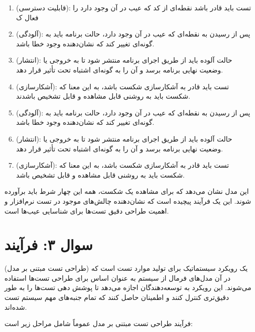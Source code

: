 \begin{enumerate}
	\item {} (قابلیت دسترسی): تست باید قادر باشد نقطه‌ای از کد که عیب در آن وجود دارد را فعال ک
	\item {} (آلودگی): پس از رسیدن به نقطه‌ای که عیب در آن وجود دارد، حالت برنامه باید به گونه‌ای تغییر کند که نشان‌دهنده وجود خطا باشد.
	
	\item {} (انتشار): حالت آلوده باید از طریق اجرای برنامه منتشر شود تا به خروجی یا وضعیت نهایی برنامه برسد و آن را به گونه‌ای اشتباه تحت تأثیر قرار دهد.
	
	\item {} (آشکارسازی): تست باید قادر به آشکارسازی شکست باشد، به این معنا که شکست باید به روشنی قابل مشاهده و قابل تشخیص باشدند.

	\item {} (آلودگی): پس از رسیدن به نقطه‌ای که عیب در آن وجود دارد، حالت برنامه باید به گونه‌ای تغییر کند که نشان‌دهنده وجود خطا باشد.
	
	\item {} (انتشار): حالت آلوده باید از طریق اجرای برنامه منتشر شود تا به خروجی یا وضعیت نهایی برنامه برسد و آن را به گونه‌ای اشتباه تحت تأثیر قرار دهد.
	
	\item {} (آشکارسازی): تست باید قادر به آشکارسازی شکست باشد، به این معنا که شکست باید به روشنی قابل مشاهده و قابل تشخیص باشد.
\end{enumerate}

این مدل نشان می‌دهد که برای مشاهده یک شکست، همه این چهار شرط باید برآورده شوند. این یک فرآیند پیچیده است که نشان‌دهنده چالش‌های موجود در تست نرم‌افزار و اهمیت طراحی دقیق تست‌ها برای شناسایی عیب‌ها است.

\section*{سوال ۳: فرآیند }

(طراحی تست مبتنی بر مدل) یک رویکرد سیستماتیک برای تولید موارد تست است که در آن مدل‌های فرمال از سیستم به عنوان اساس برای طراحی تست‌ها استفاده می‌شوند. این رویکرد به توسعه‌دهندگان اجازه می‌دهد تا پوشش دهی تست‌ها را به طور دقیق‌تری کنترل کنند و اطمینان حاصل کنند که تمام جنبه‌های مهم سیستم تست شده‌اند.

فرآیند طراحی تست مبتنی بر مدل عموماً شامل مراحل زیر است:

